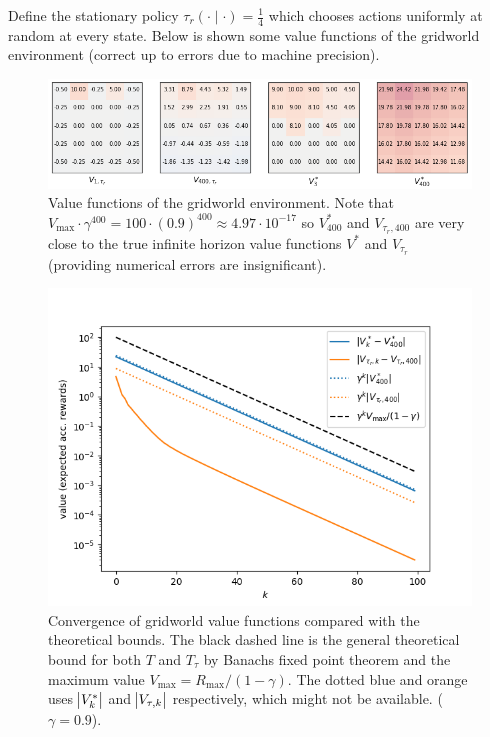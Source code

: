 \begin{example}[Gridworld]
  Define the stationary policy $\tau_r(\cdot \mid \cdot) = \frac{1}{4}$ which
  chooses actions uniformly at random at every state.
  Below is shown some value functions of the gridworld environment
  (correct up to errors due to machine precision).

  \begin{figure}[h]
    \centering
    \includegraphics[scale=0.8]{figs/gridworld1.png}
    \caption{Value functions of the gridworld environment.
      Note that $V_{\max} \cdot \gamma^{400} = 100 \cdot (0.9)^{400}
      \approx 4.97 \cdot 10^{-17}$ so $V^*_{400}$ and $V_{\tau_r, 400}$
      are very close to the true infinite horizon value functions
    $V^*$ and $V_{\tau_r}$ (providing numerical errors are insignificant).}
    \label{fig:gw1}
  \end{figure}

  \begin{figure}[h]
    \centering
    \includegraphics[scale=0.7]{figs/gridworld2.png}
    \caption{Convergence of gridworld value functions compared with
      the theoretical bounds. The black dashed line is the general theoretical
      bound for both $T$ and $T_{\tau}$ by Banachs fixed point theorem and
      the maximum value $V_{\max} = R_{\max} / (1-\gamma)$.
      The dotted blue and orange uses $\abs{V_k^*}$ and $\abs{V_{\tau, k}}$ 
      respectively, which might not be available.
    ($\gamma = 0.9$).}
    \label{fig:gw2}
  \end{figure}

  \label{ex:gridworld}
\end{example}

